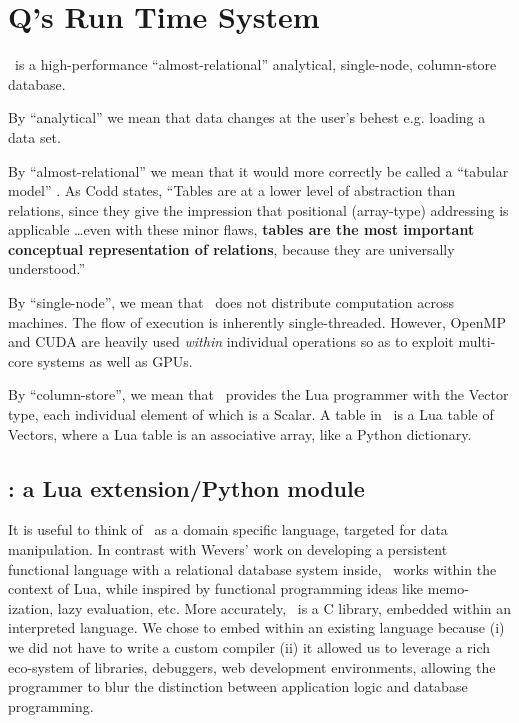 \section{Q's Run Time System}

\Q\ is a high-performance ``almost-relational'' 
analytical, single-node, column-store database. 
\be
\item 
By ``analytical'' we mean that data changes at the user's behest e.g.
loading a data set.
\item 
By ``almost-relational'' we mean that it would more correctly
be called a ``tabular model'' \cite{Codd1982}. As Codd states, ``Tables are
at a lower level of abstraction than relations, since they give
the impression that positional (array-type) addressing is applicable
\ldots even with these minor flaws,
{\bf tables are the most important conceptual representation of
relations}, because they are universally understood.''
\item By ``single-node'', we mean that \Q\ does not distribute computation across
  machines. The flow of execution is inherently single-threaded. However,
  OpenMP and CUDA are heavily used {\em within} individual operations so as
  to exploit multi-core systems as well as GPUs.
\item By ``column-store'', we mean that 
\Q\ provides the Lua programmer with the Vector type, each
individual element of which is a Scalar. A table in \Q\ is a Lua
table of Vectors, where a Lua table is an
associative array, like a Python dictionary.

\ee

\subsection{\Q: a Lua extension/Python module}

It is useful to think of \Q\ as a domain specific language, targeted for data
manipulation. In contrast with Wevers' work \cite{Wevers2014} on
developing a persistent functional language with
a relational database system inside, \Q\ works within the context of Lua, while
inspired by functional programming ideas like memo-ization, lazy evaluation,
etc.
More accurately, \Q\ is a C library, embedded within an interpreted
language.
We chose to embed within an existing language because (i) we did not have to
write a custom compiler (ii) it allowed us to leverage a rich eco-system of
libraries, debuggers, web development environments, allowing the programmer to
blur the distinction between application logic and database programming.

